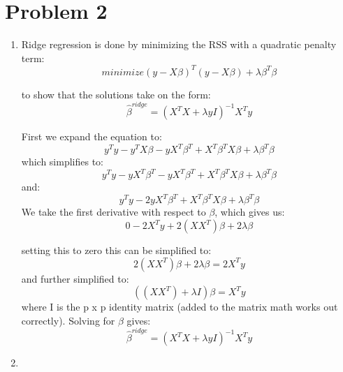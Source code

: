 \section*{Problem 2}
\begin{enumerate}
\item 
Ridge regression is done by minimizing the RSS with a quadratic penalty term:
\[ minimize (y -X\beta)^T(y-X\beta) + \lambda\beta^T\beta  \]

\noindent to show that the solutions take on the form:
\[ \hat{\beta}^{ridge} = (X^TX + \lambda yI)^{-1}X^Ty \]

\noindent First we expand the equation to:
\[ y^Ty - y^TX\beta - yX^T\beta^T + X^T\beta^TX\beta + \lambda\beta^T\beta \]
\noindent which simplifies to:
\[ y^Ty - yX^T\beta^T - yX^T\beta^T + X^T\beta^TX\beta + \lambda\beta^T\beta \]
\noindent and:
\[ y^Ty - 2yX^T\beta^T + X^T\beta^TX\beta + \lambda\beta^T\beta \]
\noindent We take the first derivative with respect to $\beta$, which gives us:
\[ 0 - 2X^Ty + 2(XX^T)\beta  + 2\lambda\beta\] 

\noindent setting this to zero this can be simplified to: 
\[ 2(XX^T)\beta + 2\lambda\beta = 2X^Ty \]
\noindent and further simplified to: 
\[ ((XX^T)+ \lambda I)\beta = X^Ty \]
\noindent where I is the p x p identity matrix (added to the matrix math works out correctly). Solving for $\beta$ gives:
\[ \hat{\beta}^{ridge} = (X^TX + \lambda yI)^{-1}X^Ty \]
\item
\end{enumerate}






